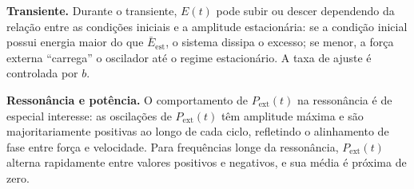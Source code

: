 \textbf{Transiente.} Durante o transiente, $E(t)$ pode subir ou descer dependendo da relação entre as condições iniciais e a amplitude estacionária: se a condição inicial possui energia maior do que $\bar{E}_\text{est}$, o sistema dissipa o excesso; se menor, a força externa ``carrega'' o oscilador até o regime estacionário. A taxa de ajuste é controlada por $b$.

\textbf{Ressonância e potência.} O comportamento de $P_\text{ext}(t)$ na ressonância é de especial interesse: as oscilações de $P_\text{ext}(t)$ têm amplitude máxima e são majoritariamente positivas ao longo de cada ciclo, refletindo o alinhamento de fase entre força e velocidade. Para frequências longe da ressonância, $P_\text{ext}(t)$ alterna rapidamente entre valores positivos e negativos, e sua média é próxima de zero.
